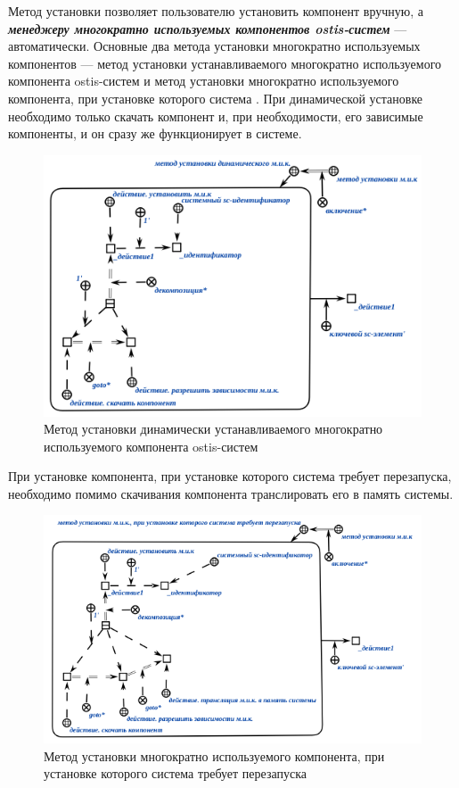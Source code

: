 Метод установки позволяет пользователю установить компонент вручную, а \textbf{\textit{менеджеру многократно используемых компонентов ostis-систем}} --- автоматически. Основные два метода установки многократно используемых компонентов --- метод установки  устанавливаемого многократно используемого компонента ostis-систем и метод установки многократно используемого компонента, при установке которого система . При динамической установке необходимо только скачать компонент и, при необходимости, его зависимые компоненты, и он сразу же функционирует в системе. 

\begin{figure}[H]
	\includegraphics[scale=0.6]{author/part5/figures/install_dynamic_method.png}
	\caption{Метод установки динамически устанавливаемого многократно используемого компонента ostis-систем}
	\label{fig:dynamic_method}
\end{figure}

При установке компонента, при установке которого система требует перезапуска, необходимо помимо скачивания компонента транслировать его в память системы.

\begin{figure}[H]
	\includegraphics[scale=0.6]{author/part5/figures/install_with_reboot_method.png}
	\caption{Метод установки многократно используемого компонента, при установке которого система требует перезапуска}
	\label{fig:install_with_reboot_method}
\end{figure}


